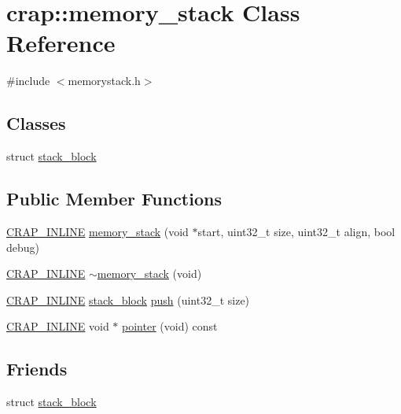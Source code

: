 \hypertarget{classcrap_1_1memory__stack}{}\section{crap\+:\+:memory\+\_\+stack Class Reference}
\label{classcrap_1_1memory__stack}


{\ttfamily \#include $<$memorystack.\+h$>$}

\subsection*{Classes}
\begin{DoxyCompactItemize}
\item 
struct \hyperlink{structcrap_1_1memory__stack_1_1stack__block}{stack\+\_\+block}
\end{DoxyCompactItemize}
\subsection*{Public Member Functions}
\begin{DoxyCompactItemize}
\item 
\hyperlink{config__x86_8h_a5a40526b8d842e7ff731509998bb0f1c}{C\+R\+A\+P\+\_\+\+I\+N\+L\+I\+N\+E} \hyperlink{classcrap_1_1memory__stack_a9689f0764e1451db5e1f1c6310d00c64}{memory\+\_\+stack} (void $\ast$start, uint32\+\_\+t size, uint32\+\_\+t align, bool debug)
\item 
\hyperlink{config__x86_8h_a5a40526b8d842e7ff731509998bb0f1c}{C\+R\+A\+P\+\_\+\+I\+N\+L\+I\+N\+E} \hyperlink{classcrap_1_1memory__stack_ac8ba25515e97c6149f3b1d60927e6acd}{$\sim$memory\+\_\+stack} (void)
\item 
\hyperlink{config__x86_8h_a5a40526b8d842e7ff731509998bb0f1c}{C\+R\+A\+P\+\_\+\+I\+N\+L\+I\+N\+E} \hyperlink{structcrap_1_1memory__stack_1_1stack__block}{stack\+\_\+block} \hyperlink{classcrap_1_1memory__stack_ac657c7de8dee6ee5027e81e755d8dc67}{push} (uint32\+\_\+t size)
\item 
\hyperlink{config__x86_8h_a5a40526b8d842e7ff731509998bb0f1c}{C\+R\+A\+P\+\_\+\+I\+N\+L\+I\+N\+E} void $\ast$ \hyperlink{classcrap_1_1memory__stack_ac2f427387d34f0d32d99e89f19a3e031}{pointer} (void) const 
\end{DoxyCompactItemize}
\subsection*{Friends}
\begin{DoxyCompactItemize}
\item 
struct \hyperlink{classcrap_1_1memory__stack_abdb549c24c617910dfa86bc8d8412eb3}{stack\+\_\+block}
\end{DoxyCompactItemize}


